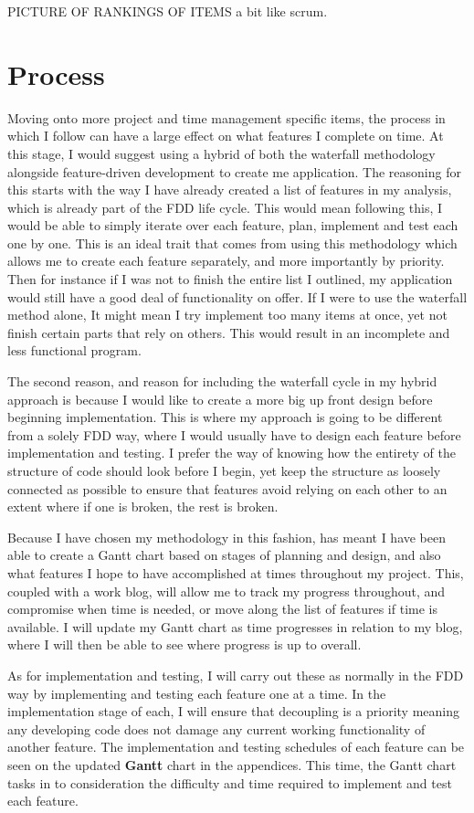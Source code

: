 PICTURE OF RANKINGS OF ITEMS a bit like scrum.

\section{Process}
Moving onto more project and time management specific items, the process in which I follow can have a large effect on what features I complete on time. At this stage, I would suggest using a hybrid of both the waterfall methodology alongside feature-driven development to create me application. The reasoning for this starts with the way I have already created a list of features in my analysis, which is already part of the FDD life cycle. This would mean following this, I would be able to simply iterate over each feature, plan, implement and test each one by one. This is an ideal trait that comes from using this methodology which allows me to create each feature separately, and more importantly by priority. Then for instance if I was not to finish the entire list I outlined, my application would still have a good deal of functionality on offer. If I were to use the waterfall method alone, It might mean I try implement too many items at once, yet not finish certain parts that rely on others. This would result in an incomplete and less functional program.

The second reason, and reason for including the waterfall cycle in my hybrid approach is because I would like to create a more big up front design before beginning implementation. This is where my approach is going to be different from a solely FDD way, where I would usually have to design each feature before implementation and testing. I prefer the way of knowing how the entirety of the structure of code should look before I begin, yet keep the structure as loosely connected as possible to ensure that features avoid relying on each other to an extent where if one is broken, the rest is broken. 

Because I have chosen my methodology in this fashion, has meant I have been able to create a Gantt chart based on stages of planning and design, and also what features I hope to have accomplished at times throughout my project. This, coupled with a work blog, will allow me to track my progress throughout, and compromise when time is needed, or move along the list of features if time is available. I will update my Gantt chart as time progresses in relation to my blog, where I will then be able to see where progress is up to overall.

As for implementation and testing, I will carry out these as normally in the FDD way by implementing and testing each feature one at a time. In the implementation stage of each, I will ensure that decoupling is a priority meaning any developing code does not damage any current working functionality of another feature. The implementation and testing schedules of each feature can be seen on the updated \textbf{Gantt} chart in the appendices. This time, the Gantt chart tasks in to consideration the difficulty and time required to implement and test each feature.